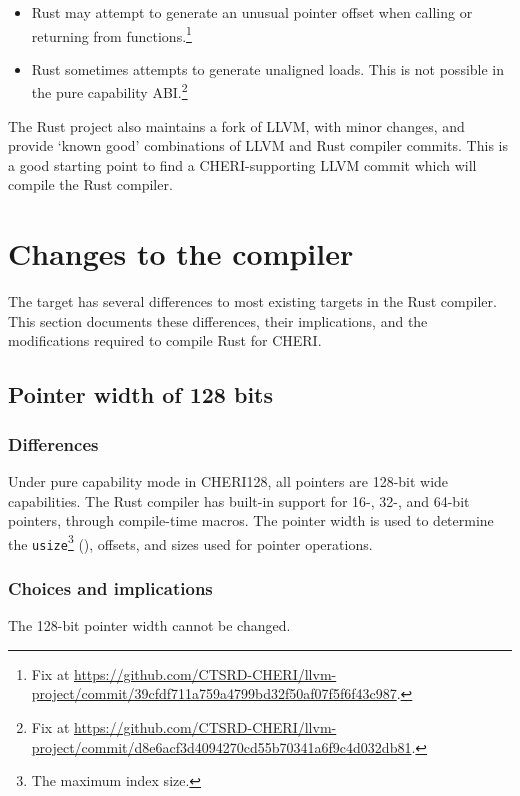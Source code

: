 \documentclass[dissertation.tex]{subfiles}
\begin{document}
\begin{itemize}
    \item Rust may attempt to generate an unusual pointer offset when
    calling or returning from functions.\footnote{Fix at \url{https://github.com/CTSRD-CHERI/llvm-project/commit/39cfdf711a759a4799bd32f50af07f5f6f43c987}.}
    \item Rust sometimes attempts to generate unaligned loads.
    This is not possible in the pure capability ABI.\footnote{Fix at \url{https://github.com/CTSRD-CHERI/llvm-project/commit/d8e6acf3d4094270cd55b70341a6f9c4d032db81}.}
\end{itemize}

The Rust project also maintains a fork of LLVM, with minor changes, and
provide `known good' combinations of LLVM and Rust compiler commits.
This is a good starting point to find a CHERI-supporting LLVM commit
which will compile the Rust compiler.


\section{Changes to the compiler}
\label{sec:impl-div-compiler}

The \cuf target has several differences to most existing targets in the
Rust compiler.
This section documents these differences, their implications, and the
modifications required to compile Rust for CHERI.


\subsection{Pointer width of 128 bits}
\label{sec:impl-width}

\subsubsection{Differences}
Under pure capability mode in CHERI128, all pointers are 128-bit wide
capabilities.
The Rust compiler has built-in support for 16-, 32-, and 64-bit
pointers, through compile-time macros.
The pointer width is used to determine the \texttt{usize}\footnote{The
maximum index size.} (), offsets, and sizes used
for pointer operations.

\subsubsection{Choices and implications}
The 128-bit pointer width cannot be changed.
\end{document}
